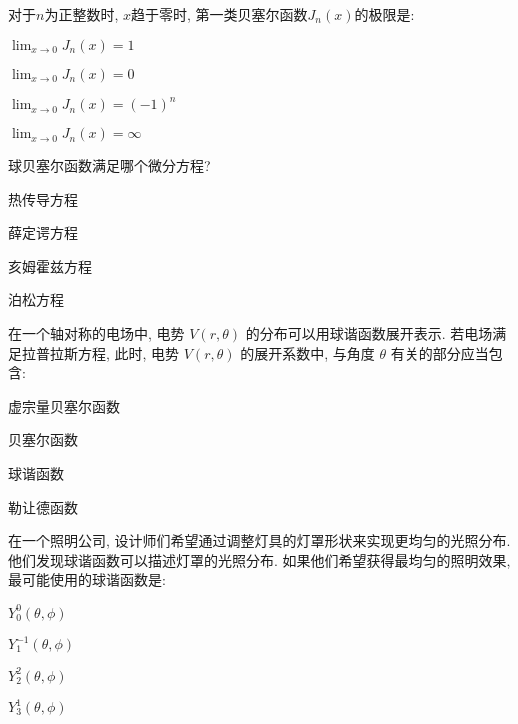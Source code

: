 \documentclass{njustexam}
\begin{document}
\begin{problem}
  对于$n$为正整数时, $x$趋于零时, 第一类贝塞尔函数$J_n(x)$的极限是:

  \begin{abcd}
\item $\lim_{x \to 0} J_n(x) = 1$

\item $\lim_{x \to 0} J_n(x) = 0$

\item $\lim_{x \to 0} J_n(x) = (-1)^n$

\item $\lim_{x \to 0} J_n(x) = \infty$
 \end{abcd}
\end{problem}


\begin{problem}
  球贝塞尔函数满足哪个微分方程? 

  \begin{abcd}
    \item 热传导方程
    \item 薛定谔方程
    \item 亥姆霍兹方程
    \item 泊松方程
  \end{abcd}
\end{problem}

\begin{problem}
  在一个轴对称的电场中, 电势 $V(r,  \theta)$ 的分布可以用球谐函数展开表示. 
  若电场满足拉普拉斯方程, 
  此时, 电势 $V(r,  \theta)$ 的展开系数中, 与角度 $\theta$ 有关的部分应当包含: 
  \begin{abcd}
  \item 虚宗量贝塞尔函数
  \item 贝塞尔函数 
  \item 球谐函数 
  \item 勒让德函数
  \end{abcd}
\end{problem}



\begin{problem}
  在一个照明公司, 设计师们希望通过调整灯具的灯罩形状来实现更均匀的光照分布. 他们发现球谐函数可以描述灯罩的光照分布. 如果他们希望获得最均匀的照明效果, 最可能使用的球谐函数是:
  \begin{abcd}
  \item $Y_{0}^0(\theta,  \phi)$
  
  \item $Y_{1}^{-1}(\theta,  \phi)$
  
  \item $Y_{2}^2(\theta,  \phi)$
  
  \item $Y_{3}^1(\theta,  \phi)$
  \end{abcd}
  \end{problem}
\end{document}
